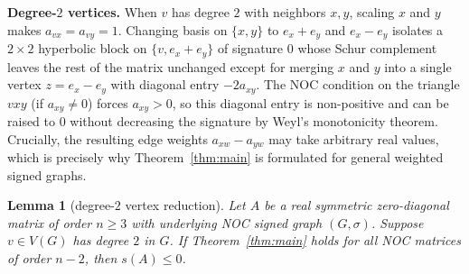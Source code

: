 \documentclass[10pt,letterpaper]{article}
\theoremstyle{zetaplain}
\newtheorem{lemma}[theorem]{Lemma}
\theoremstyle{zetadef}
\theoremstyle{remark}
\numberwithin{equation}{section}
\begin{document}
\noindent\textbf{Degree-$2$ vertices.}
When $v$ has degree $2$ with neighbors $x, y$, scaling $x$ and $y$ makes $a_{vx} = a_{vy} = 1$. Changing basis on $\{x, y\}$ to $e_x + e_y$ and $e_x - e_y$ isolates a $2 \times 2$ hyperbolic block on $\{v, e_x + e_y\}$ of signature $0$ whose Schur complement leaves the rest of the matrix unchanged except for merging $x$ and $y$ into a single vertex $z = e_x - e_y$ with diagonal entry $-2a_{xy}$. The NOC condition on the triangle $vxy$ (if $a_{xy} \ne 0$) forces $a_{xy} > 0$, so this diagonal entry is non-positive and can be raised to $0$ without decreasing the signature by Weyl's monotonicity theorem. Crucially, the resulting edge weights $a_{xw} - a_{yw}$ may take arbitrary real values, which is precisely why Theorem~\ref{thm:main} is formulated for general weighted signed graphs.

\begin{lemma}[degree-$2$ vertex reduction]\label{lem:deg2}
Let $A$ be a real symmetric zero-diagonal matrix of order $n \ge 3$ with underlying NOC signed graph $(G, \sigma)$. Suppose $v \in V(G)$ has degree $2$ in $G$. If Theorem~\ref{thm:main} holds for all NOC matrices of order $n - 2$, then $s(A) \le 0$.
\end{lemma}
\end{document}

